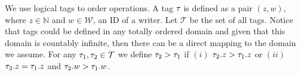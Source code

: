 
%
We use logical tags to order operations. A tag $\tau_{}$ is defined as a pair $(z, w)$, where $z \in \mathbb{N}$ and $w \in \mathcal{W}$, an ID of a writer.
Let $\mathcal{T}$ be the set of all tags.
Notice that tags could be defined in any totally ordered domain and given that this domain is countably infinite, then 
there can be a direct mapping to the domain we assume. 
For any  $\tau_{1}, \tau_{2} \in \mathcal{T}$ we define  $\tau_{2} > \tau_{1}$ if $(i)$ $\tau_{2}.z > \tau_{1}.z$ or $(ii)$ $\tau_{2}.z = \tau_{1}.z$ and $\tau_{2}.w > \tau_{1}.w$.
